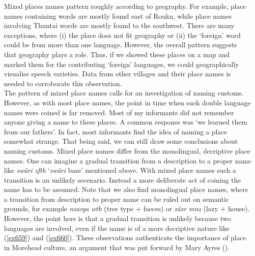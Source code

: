 Mixed places names pattern roughly according to geography. For example, place names containing  words are mostly found east of Rouku, while place names involving  Thuntai words are mostly found to the southwest. There are many exceptions, where (i) the place does not fit geography or (ii) the `foreign' word could be from more than one language. However, the overall pattern suggests that geography plays a role. Thus, if we showed these places on a map and marked them for the contributing `foreign' languages, we could geographically visualise speech varieties. Data from other villages and their place names is needed to corroborate this observation.\\

The pattern of mixed place names calls for an investigation of naming customs. However, as with most place names, the point in time when such double language names were coined is far removed. Most of my informants did not remember anyone giving a name to these places. A common response was `we learned them from our fathers'. In fact, most informants find the idea of naming a place somewhat strange. That being said, we can still draw some conclusions about naming customs. Mixed place names differ from the monolingual, decriptive place names. One can imagine a gradual transition from a description to a proper name like \emph{swäri zfth} `\emph{swäri} base' mentioned above. With mixed place names such a transition is an unlikely secenario. Instead a more deliberate act of coining the name has to be assumed. Note that we also find monolingual place names, where a transition from description to proper name can be ruled out on semantic grounds, for example \emph{nzarga wth} (tree type + faeces) or \emph{zäzr mnz} (lazy + house). However, the point here is that a gradual transition is unlikely because two languages are involved, even if the name is of a more decriptive nature like (\ref{ex659}) and (\ref{ex660}). These observations authenticate the importance of place in Morehead culture, an argument that was put forward by Mary Ayres (\citeyear{Ayres:ws}).\\

